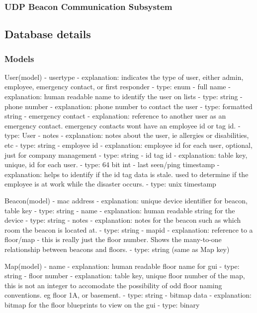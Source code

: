 \subsubsection{UDP Beacon Communication Subsystem}


\subsection{Database details}

\subsubsection{Models}

User(model)
	- usertype
		- explanation: indicates the type of user, either admin, employee, emergency contact, or first responder
		- type: enum
	- full name
		- explanation: human readable name to identify the user on lists
		- type: string
	- phone number
		- explanation: phone number to contact the user
		- type: formatted string
	- emergency contact
		- explanation: reference to another user as an emergency contact. emergency contacts wont have an employee id or tag id.
		- type: User
	- notes
		- explanation: notes about the user, ie allergies or disabilities, etc
		- type: string
	- employee id
		- explanation: employee id for each user, optional, just for company management
		- type: string
	- id tag id
		- explanation: table key, unique, id for each user.
		- type: 64 bit int
	- last seen/ping timestamp
		- explanation: helps to identify if the id tag data is stale. used to determine if the employee is at work while the disaster occurs.
		- type: unix timestamp

Beacon(model)
	- mac address
		- explanation: unique device identifier for beacon, table key
		- type: string
	- name
		- explanation: human readable string for the device
		- type: string
	- notes
		- explanation: notes for the beacon such as which room the beacon is located at.
		- type: string
	- mapid
		- explanation: reference to a floor/map - this is really just the floor number. Shows the many-to-one relationship between beacons and floors.
		- type: string (same as Map key)


Map(model)
	- name
		- explanation: human readable floor name for gui
		- type: string
	- floor number
		- explanation: table key, unique floor number of the map, this is not an integer to accomodate the possibility of odd floor naming conventions. eg floor 1A, or basement.
		- type: string
	- bitmap data
		- explanation: bitmap for the floor blueprints to view on the gui
		- type: binary

